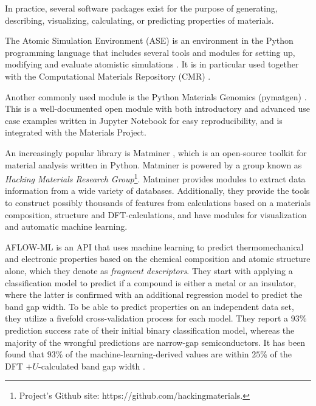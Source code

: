 In practice, several software packages exist for the purpose of generating, describing, visualizing, calculating, or predicting properties of materials.

The Atomic Simulation Environment (ASE) is an environment in the Python programming language that includes several tools and modules for setting up, modifying and evaluate atomistic simulations \cite{Larsen2017}. It is in particular used together with the Computational Materials Repository (CMR) \cite{Landis2012}.

Another commonly used module is the Python Materials Genomics (pymatgen) \cite{Ong2013}. This is a well-documented open module with both introductory and advanced use case examples written in Jupyter Notebook for easy reproducibility, and is integrated with the Materials Project. %

An increasingly popular library is Matminer \cite{Ward2018}, which is an open-source toolkit for material analysis written in Python. Matminer is powered by a group known as \textit{Hacking Materials Research Group}\footnote{Project's Github site: https://github.com/hackingmaterials.}. Matminer provides modules to extract data information from a wide variety of databases. Additionally, they provide the tools to construct possibly thousands of features from calculations based on a materials composition, structure and DFT-calculations, and have modules for visualization and automatic machine learning.

AFLOW-ML \cite{Isayev2017} is an API that uses machine learning to predict thermomechanical and electronic properties based on the chemical composition and atomic structure alone, which they denote as \textit{fragment descriptors}. They start with applying a classification model to predict if a compound is either a metal or an insulator, where the latter is confirmed with an additional regression model to predict the band gap width. To be able to predict properties on an independent data set, they utilize a fivefold cross-validation process for each model. They report a $93$\% prediction success rate of their initial binary classification model, whereas the majority of the wrongful predictions are narrow-gap semiconductors. It has been found that $93$\% of the machine-learning-derived values are within $25$\% of the DFT $+U$-calculated band gap width \cite{Ferrenti2020}.



